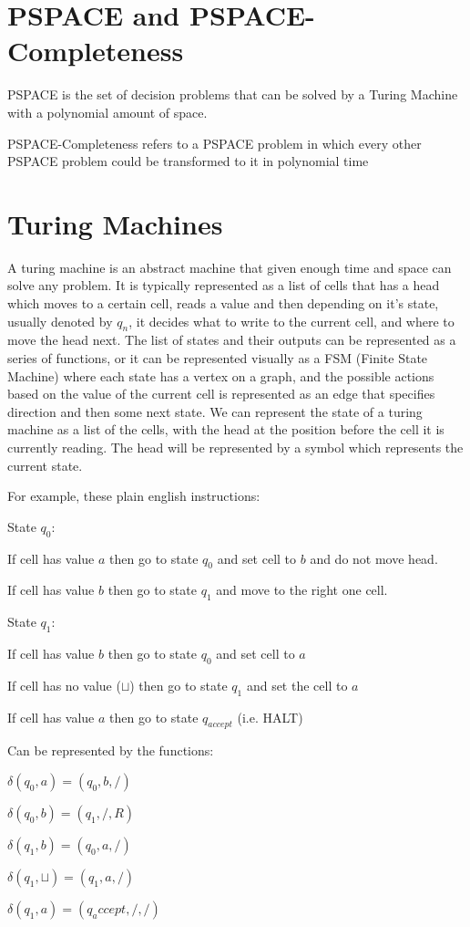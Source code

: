 \documentclass{article}
\begin{document}
\section{PSPACE and PSPACE-Completeness}
PSPACE is the set of decision problems that can be solved by a Turing Machine with a polynomial amount of
space. 

PSPACE-Completeness refers to a PSPACE problem in which every other PSPACE problem could be transformed to it in 
polynomial time

\section{Turing Machines}
A turing machine is an abstract machine that given enough time and space can solve any problem. It
is typically represented as a list of cells that has a head which moves to a certain cell, reads a value
and then depending on it's state, usually denoted by $q_n$, it decides what to write to the current cell,
and where to move the head next. The list of states and their outputs can be represented as a series of functions, 
or it can be represented visually as a FSM (Finite State Machine) where each state has a vertex on a graph, and the
possible actions based on the value of the current cell is represented as an edge that specifies direction and then 
some next state. We can represent the state of a turing machine as a list of the cells, with the head at the position
before the cell it is currently reading. The head will be represented by a symbol which represents the current state.

\begin{multicols}{2}
    

For example, these plain english instructions:

State $q_0$:

If cell has value $a$ then go to state $q_0$ and set cell to $b$ and do not move head.

If cell has value $b$ then go to state $q_1$ and move to the right one cell.

State $q_1$:

If cell has value $b$ then go to state $q_0$ and set cell to $a$

If cell has no value ($\sqcup$) then go to state $q_1$ and set the cell to $a$

If cell has value $a$ then go to state $q_{accept}$ (i.e. HALT)

\columnbreak

Can be represented by the functions:


$\delta(q_0, a)  = (q_0, b, /)$

$\delta(q_0, b)  = (q_1, /, R)$

$\delta(q_1, b)  = (q_0, a, /)$

$\delta(q_1, \sqcup)  = (q_1, a, /)$

$\delta(q_1, a)  = (q_accept, /, /)$

\end{multicols}
\end{document}
